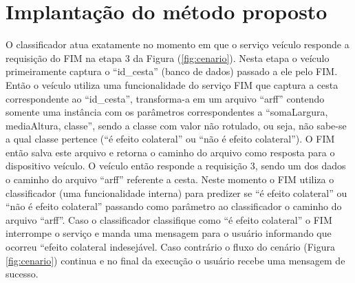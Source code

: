 \section{Implantação do método proposto}
\label{sec:implmetprop}
O classificador atua exatamente no momento em que o serviço veículo responde a requisição do FIM na etapa 3 da Figura (\ref{fig:cenario}). Nesta etapa o veículo primeiramente captura o ``id\_cesta'' (banco de dados) passado a ele pelo FIM. Então o veículo utiliza uma funcionalidade do serviço FIM que captura a cesta correspondente ao ``id\_cesta'', transforma-a em um arquivo ``arff'' contendo somente uma instância com os parâmetros correspondentes a ``somaLargura, mediaAltura, classe'', sendo a classe com valor não rotulado, ou seja, não sabe-se a qual classe pertence (``é efeito colateral'' ou ``não é efeito colateral''). O FIM então salva este arquivo e retorna o caminho do arquivo como resposta para o dispositivo veículo. O veículo então responde a requisição 3, sendo um dos dados o caminho do arquivo ``arff'' referente a cesta. Neste momento o FIM utiliza o classificador (uma funcionalidade interna) para predizer se ``é efeito colateral'' ou ``não é efeito colateral'' passando como parâmetro ao classificador o caminho do arquivo ``arff''. Caso o classificador classifique como ``é efeito colateral'' o FIM interrompe o serviço e manda uma mensagem para o usuário informando que ocorreu ``efeito colateral indesejável. Caso contrário o fluxo do cenário (Figura \ref{fig:cenario}) continua e no final da execução o usuário recebe uma mensagem de sucesso.
